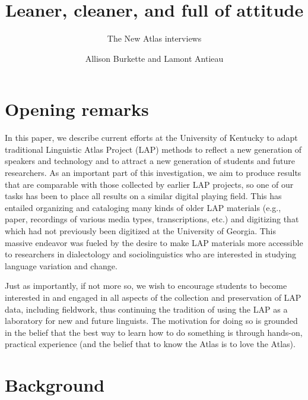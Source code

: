 \documentclass[output=paper]{langscibook}
\author{Allison Burkette\affiliation{University of Kentucky} and Lamont Antieau\affiliation{University of Kentucky}}
\title{Leaner, cleaner, and full of attitude}
\subtitle{The New Atlas interviews}
\begin{document}
\maketitle
\label{chap:burkette}
\graphicspath{{figures/burkette}}

\section{Opening remarks}
\label{sec:burkette:1}

In this paper, we describe current efforts at the University of Kentucky to adapt traditional Linguistic Atlas Project (LAP) methods to reflect a new generation of speakers and technology and to attract a new generation of students and future researchers. As an important part of this investigation, we aim to produce results that are comparable with those collected by earlier LAP projects, so one of our tasks has been to place all results on a similar digital playing field. This has entailed organizing and cataloging many kinds of older LAP materials (e.g., paper, recordings of various media types, transcriptions, etc.) and digitizing that which had not previously been digitized at the University of Georgia. This massive endeavor was fueled by the desire to make LAP materials more accessible to researchers in dialectology and sociolinguistics who are interested in studying language variation and change.

Just as importantly, if not more so, we wish to encourage students to become interested in and engaged in all aspects of the collection and preservation of LAP data, including fieldwork, thus continuing the tradition of using the LAP as a laboratory for new and future linguists. The motivation for doing so is grounded in the belief that the best way to learn how to do something is through hands-on, practical experience (and the belief that to know the Atlas is to love the Atlas).  

\section{Background} %
\label{sec:burkette:2}
\end{document}

